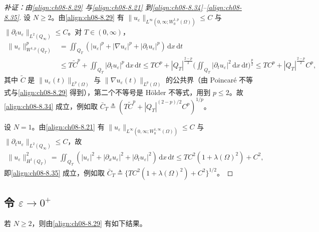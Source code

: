 \documentclass[../../main.tex]{subfiles}%
\begin{document}
\begin{proof}[补证：由\eqref{align:ch08-8.29} 与\eqref{align:ch08-8.21} 到\eqref{align:ch08-8.34}--\eqref{align:ch08-8.35}]
设 $N\geqslant2$。由\eqref{align:ch08-8.29} 有 $\|u_\varepsilon\|_{L^\infty(0,\infty;W^{1,p}_0(\Omega))}\leqslant C$ 与 $\|\partial_tu_\varepsilon\|_{L^2(Q_\infty)}\leqslant C$。对 $T\in(0,\infty)$，
\begin{align*}
\|u_\varepsilon\|^p_{W^{1,p}(Q_T)}
&=\iint_{Q_T}(|u_\varepsilon|^p+|\nabla u_\varepsilon|^p+|\partial_tu_\varepsilon|^p)\,\mathrm{d}x\,\mathrm{d}t\\
&\leqslant T\tilde C^p+\iint_{Q_T}|\partial_tu_\varepsilon|^p\,\mathrm{d}x\,\mathrm{d}t
\leqslant TC^p+|Q_T|^{\frac{2-p}{2}}\Big(\iint_{Q_T}|\partial_tu_\varepsilon|^2\,\mathrm{d}x\,\mathrm{d}t\Big)^{\frac p2}
\leqslant TC^p+|Q_T|^{\frac{2-p}{2}}C^p,
\end{align*}
其中 $\tilde C$ 是 $\|u_\varepsilon(t)\|_{L^p(\Omega)}$ 与 $\|\nabla u_\varepsilon(t)\|_{L^p(\Omega)}$ 的公共界（由 Poincaré 不等式与\eqref{align:ch08-8.29} 得到），第二个不等号是 Hölder 不等式，用到 $p\leqslant2$。故\eqref{align:ch08-8.34} 成立，例如取 $\bar C_T\triangleq(T\tilde C^p+|Q_T|^{(2-p)/2}C^p)^{1/p}$。

设 $N=1$。由\eqref{align:ch08-8.21} 有 $\|u_\varepsilon\|_{L^\infty(0,\infty;W^{1,\infty}_0(\Omega))}\leqslant C$ 与 $\|\partial_tu_\varepsilon\|_{L^2(Q_\infty)}\leqslant C$，故
\begin{align*}
\|u_\varepsilon\|^2_{H^1(Q_T)}
=\iint_{Q_T}(|u_\varepsilon|^2+|\partial_xu_\varepsilon|^2+|\partial_tu_\varepsilon|^2)\,\mathrm{d}x\,\mathrm{d}t
\leqslant T C^2(1+\lambda(\Omega)^2)+C^2,
\end{align*}
即\eqref{align:ch08-8.35} 成立，例如取 $\bar C_T\triangleq\{TC^2(1+\lambda(\Omega)^2)+C^2\}^{1/2}$。
\end{proof}

\subsection{令 $\varepsilon\to0^+$}\label{subsection:ch08-极限过程}

若 $N\geqslant2$，则由\eqref{align:ch08-8.29} 有如下结果。
\end{document}
